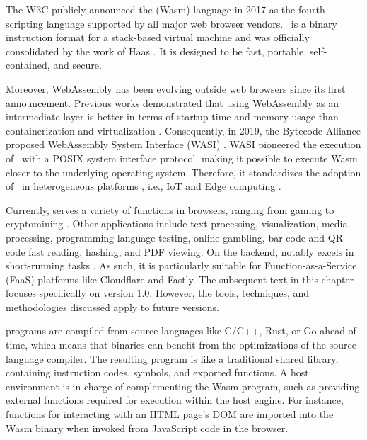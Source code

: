 \msection{\Wasm}
\label{sota:wasm}
The W3C publicly announced the \Wasm(Wasm) language in 2017 as the fourth scripting language supported by all major web browser vendors.
\Wasm\ is a binary instruction format for a stack-based virtual machine and was officially consolidated by the work of Haas \etal \cite{Haas_2017}. 
It is designed to be fast, portable, self-contained, and secure.


Moreover, WebAssembly has been evolving outside web browsers since its first announcement.
Previous works demonstrated that using WebAssembly as an intermediate layer is better in terms of startup time and memory usage than containerization and virtualization \cite{pMendkiServerless, 1244493Jacobsson}. 
Consequently, in 2019, the Bytecode Alliance proposed WebAssembly System Interface (WASI) \cite{WASI}. 
WASI pioneered the execution of \Wasm\ with a POSIX system interface protocol, making it possible to execute Wasm closer to the underlying operating system. 
Therefore, it standardizes the adoption of \Wasm\ in heterogeneous platforms \cite{bryant2020webassembly}, i.e., IoT and Edge computing \cite{9640153, wen2020wasmachine}.

Currently, \Wasm serves a variety of functions in browsers, ranging from gaming to cryptomining \cite{Hilbig2021AnES}. 
Other applications include text processing, visualization, media processing, programming language testing, online gambling, bar code and QR code fast reading, hashing, and PDF viewing. 
On the backend, \Wasm notably excels in short-running tasks \cite{10034550, 10.1145/3526059.3533618}. 
As such, it is particularly suitable for Function-as-a-Service (FaaS) platforms like Cloudflare and Fastly.
The subsequent text in this chapter focuses specifically on \Wasm version 1.0. 
However, the tools, techniques, and methodologies discussed apply to future \Wasm versions.



\Wasm programs are compiled from source languages like C/C++, Rust, or Go ahead of time, which means that \wasm binaries can benefit from the optimizations of the source language compiler.
The resulting \Wasm program is like a traditional shared library, containing instruction codes, symbols, and exported functions. 
A host environment is in charge of complementing the Wasm program, such as providing external functions required for execution within the host engine. 
For instance, functions for interacting with an HTML page's DOM are imported into the Wasm binary when invoked from JavaScript code in the browser. 

